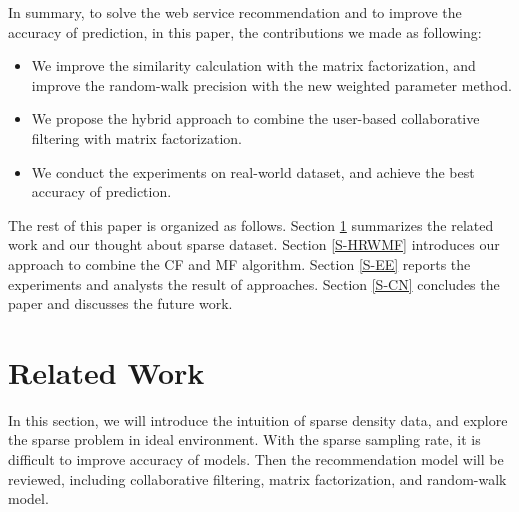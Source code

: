\documentclass[conference]{IEEEtran}
\begin{document}
\par  In summary, to solve the web service recommendation and to improve the accuracy of prediction, in this paper, the contributions we made as following:
\begin{itemize}
\item We improve the similarity calculation with the matrix factorization, and improve the random-walk precision with the new weighted parameter method.
\item We propose the hybrid approach to combine the user-based collaborative filtering with matrix factorization.
\item We conduct the experiments on real-world dataset, and achieve the best accuracy of prediction.
\end{itemize}

\par The rest of this paper is organized as follows. Section \ref{S-RW} summarizes the related work and our thought about sparse dataset. Section \ref{S-HRWMF} introduces our approach to combine the CF and MF algorithm. Section \ref{S-EE} reports the experiments and analysts the result of approaches. Section \ref{S-CN} concludes the paper and discusses the future work. 

\section{Related Work}\label{S-RW}
In this section, we will introduce the intuition of sparse density data, and explore the sparse problem in ideal environment. With the sparse sampling rate, it is difficult to improve accuracy of models. Then the recommendation model will be reviewed, including collaborative filtering, matrix factorization, and random-walk model.
\end{document}
